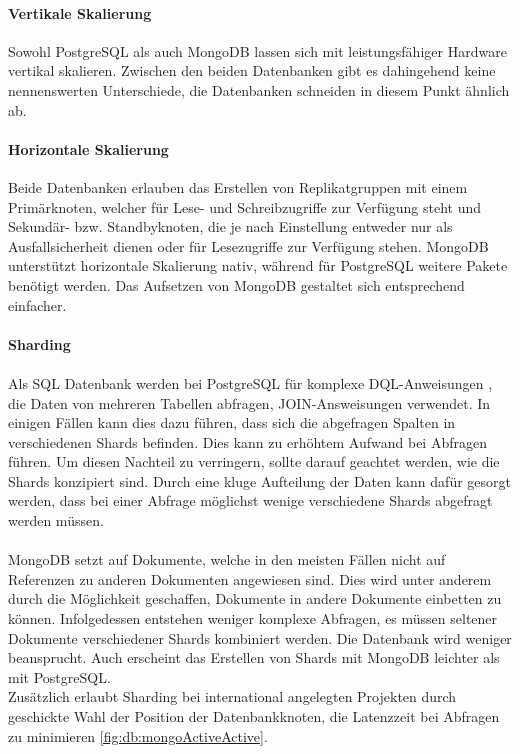 \paragraph{Vertikale Skalierung\\}
Sowohl PostgreSQL als auch MongoDB lassen sich mit leistungsfähiger Hardware vertikal skalieren.
Zwischen den beiden Datenbanken gibt es dahingehend keine nennenswerten Unterschiede, die Datenbanken schneiden in diesem Punkt ähnlich ab.

\paragraph{Horizontale Skalierung\\}
Beide Datenbanken erlauben das Erstellen von Replikatgruppen mit einem Primärknoten, welcher für Lese- und Schreibzugriffe zur Verfügung steht und Sekundär- bzw. Standbyknoten, die je nach Einstellung entweder nur als Ausfallsicherheit dienen oder für Lesezugriffe zur Verfügung stehen.
MongoDB unterstützt horizontale Skalierung nativ, während für PostgreSQL weitere Pakete benötigt werden. \cite{db:mongoVsPostgres}
Das Aufsetzen von MongoDB gestaltet sich entsprechend einfacher.

\paragraph{Sharding\\}
\paragraph{}
Als SQL Datenbank werden bei PostgreSQL für komplexe DQL-Anweisungen , die Daten von mehreren Tabellen abfragen, JOIN-Answeisungen verwendet.
In einigen Fällen kann dies dazu führen, dass sich die abgefragen Spalten in verschiedenen Shards befinden.
Dies kann zu erhöhtem Aufwand bei Abfragen führen.
Um diesen Nachteil zu verringern, sollte darauf geachtet werden, wie die Shards konzipiert sind.
Durch eine kluge Aufteilung der Daten kann dafür gesorgt werden, dass bei einer Abfrage möglichst wenige verschiedene Shards abgefragt werden müssen.

\paragraph{}
MongoDB setzt auf Dokumente, welche in den meisten Fällen nicht auf Referenzen zu anderen Dokumenten angewiesen sind.
Dies wird unter anderem durch die Möglichkeit geschaffen, Dokumente in andere Dokumente einbetten zu können.
Infolgedessen entstehen weniger komplexe Abfragen, es müssen seltener Dokumente verschiedener Shards kombiniert werden.
Die Datenbank wird weniger beansprucht.
Auch erscheint das Erstellen von Shards mit MongoDB leichter als mit PostgreSQL.\\
Zusätzlich erlaubt Sharding bei international angelegten Projekten durch geschickte Wahl der Position der Datenbankknoten, die Latenzzeit bei Abfragen zu minimieren \autoref{fig:db:mongoActiveActive}.

